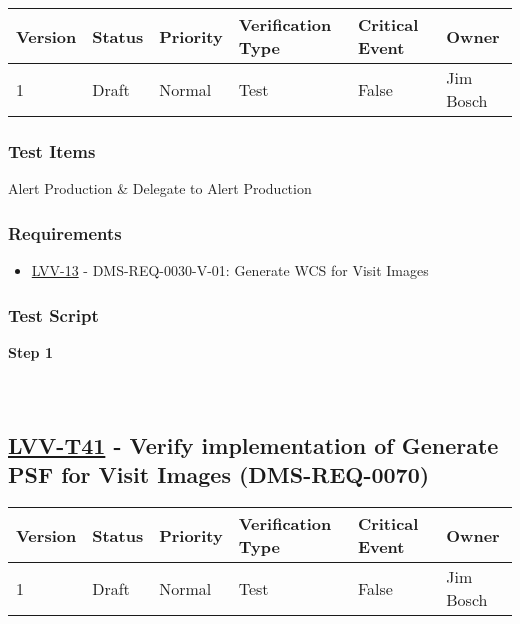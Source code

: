 \begin{longtable}[]{@{}llllll@{}}
\toprule
Version & Status & Priority & Verification Type & Critical Event &
Owner\tabularnewline
\midrule
\endhead
1 & Draft & Normal & Test & False & Jim Bosch\tabularnewline
\bottomrule
\end{longtable}

\hypertarget{test-items-16}{%
\subsubsection{Test Items}\label{test-items-16}}

Alert Production \& Delegate to Alert Production

\hypertarget{requirements-17}{%
\subsubsection{Requirements}\label{requirements-17}}

\begin{itemize}
\tightlist
\item
  \href{https://jira.lsstcorp.org/browse/LVV-13}{LVV-13} -
  DMS-REQ-0030-V-01: Generate WCS for Visit Images
\end{itemize}

\hypertarget{test-script-17}{%
\subsubsection{Test Script}\label{test-script-17}}

\textbf{Step 1}\\
~\\
~\\

\hypertarget{lvv-t41---verify-implementation-of-generate-psf-for-visit-images-dms-req-0070}{%
\subsection{\texorpdfstring{\href{https://jira.lsstcorp.org/secure/Tests.jspa\#/testCase/LVV-T41}{LVV-T41}
- Verify implementation of Generate PSF for Visit Images
(DMS-REQ-0070)}{LVV-T41 - Verify implementation of Generate PSF for Visit Images (DMS-REQ-0070)}}\label{lvv-t41---verify-implementation-of-generate-psf-for-visit-images-dms-req-0070}}

\begin{longtable}[]{@{}llllll@{}}
\toprule
Version & Status & Priority & Verification Type & Critical Event &
Owner\tabularnewline
\midrule
\endhead
1 & Draft & Normal & Test & False & Jim Bosch\tabularnewline
\bottomrule
\end{longtable}

